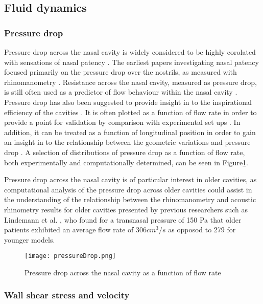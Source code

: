 \subsection{Fluid dynamics}


\subsubsection{Pressure drop}

Pressure drop across the nasal cavity is widely considered to be highly corolated with sensations of nasal patency \cite{Ottaviano2016}.
The earliest papers investigating nasal patency focused primarily on the pressure drop over the nostrils, as measured with rhinomanometry \cite{Martin1981}. 
Resistance across the nasal cavity, measured as pressure drop, is still often used as a predictor of flow behaviour within the nasal cavity \cite{Edelstein1996, Lindemann2008, WhanKim2007}. 
Pressure drop has also been suggested to provide insight in to the inspirational efficiency of the cavities \cite{Lintermann2013}. 
It is often plotted as a function of flow rate in order to provide a point for validation by comparison with experimental set ups \cite{Wen2008, Inthavong2014}. 
In addition, it can be treated as a function of longitudinal position in order to gain an insight in to the relationship between the geometric variations and pressure drop \cite{Lintermann2013}. 
A selection of distributions of pressure drop as a function of flow rate, both experimentally and computationally determined, can be seen in Figure\ref{fig:pvf}. 

Pressure drop across the nasal cavity is of particular interest in older cavities, as computational analysis of the pressure drop across older cavities could assist in the understanding of the relationship between the rhinomanometry and acoustic rhinometry results for older cavities presented by previous researchers such as Lindemann et al. \cite{Lindemann2008}, who found for a transnasal pressure of 150 Pa that older patients exhibited an average flow rate of $306 cm^3/s$ as opposod to 279 for younger models.

\begin{figure}
  \centering
  \texttt{[image: pressureDrop.png]}
  \caption{Pressure drop across the nasal cavity as a function of flow rate} \label{fig:pvf}
\centering
\end{figure}

 \subsubsection{Wall shear stress and velocity}

